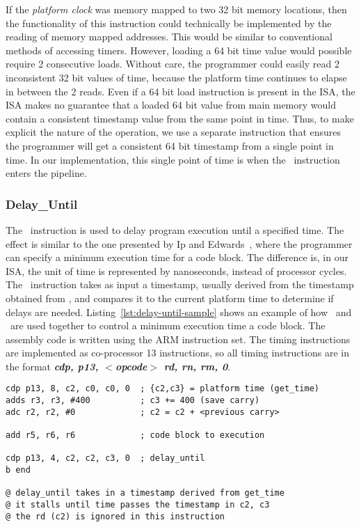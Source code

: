 If the \emph{platform clock} was memory mapped to two 32 bit memory locations, then the functionality of this instruction could technically be implemented by the reading of memory mapped addresses. 
This would be similar to conventional methods of accessing timers. 
However, loading a 64 bit time value would possible require 2 consecutive loads.
Without care, the programmer could easily read 2 inconsistent 32 bit values of time, because the platform time continues to elapse in between the 2 reads.     
Even if a 64 bit load instruction is present in the ISA, the ISA makes no guarantee that a loaded 64 bit value from main memory would contain a consistent timestamp value from the same point in time. 
Thus, to make explicit the nature of the operation, we use a separate instruction that ensures the programmer will get a consistent 64 bit timestamp from a single point in time.    
In our implementation, this single point of time is when the \gettime\ instruction enters the pipeline.

\subsubsection{Delay\_Until}
The \delayuntil\ instruction is used to delay program execution until a specified time.
The effect is similar to the one presented by Ip and Edwards~\cite{ip2006processor}, where the programmer can specify a minimum execution time for a code block.
The difference is, in our ISA, the unit of time is represented by nanoseconds, instead of processor cycles.
The \delayuntil\ instruction takes as input a timestamp, usually derived from the timestamp obtained from \gettime, and compares it to the current platform time to determine if delays are needed.
Listing~\ref{lst:delay-until-sample} shows an example of how \delayuntil\ and \gettime\ are used together to control a minimum execution time a code block.
The assembly code is written using the ARM instruction set.
The timing instructions are implemented as co-processor 13 instructions, so all timing instructions are in the format \textbf{\textit{cdp, p13, $<$opcode$>$ rd, rn, rm, 0}}.

\begin{lstlisting}[label=lst:delay-until-sample,caption=Sample assembly code of delay\_until ]
cdp p13, 8, c2, c0, c0, 0  ; {c2,c3} = platform time (get_time)
adds r3, r3, #400          ; c3 += 400 (save carry)
adc r2, r2, #0             ; c2 = c2 + <previous carry> 

add r5, r6, r6             ; code block to execution

cdp p13, 4, c2, c2, c3, 0  ; delay_until 
b end

@ delay_until takes in a timestamp derived from get_time
@ it stalls until time passes the timestamp in c2, c3
@ the rd (c2) is ignored in this instruction
\end{lstlisting}

